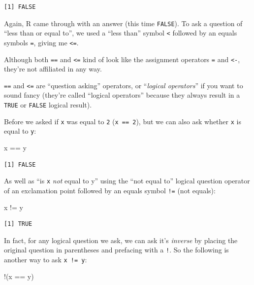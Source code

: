 \documentclass[
  letterpaper,
  DIV=11,
  numbers=noendperiod]{scrreprt}
\newenvironment{Shaded}{\begin{snugshade}}{\end{snugshade}}
\newcommand{\NormalTok}[1]{\textcolor[rgb]{0.00,0.23,0.31}{#1}}
\newcommand{\SpecialCharTok}[1]{\textcolor[rgb]{0.37,0.37,0.37}{#1}}
\begin{document}
\begin{verbatim}
[1] FALSE
\end{verbatim}

Again, R came through with an answer (this time \texttt{FALSE}). To ask
a question of ``less than or equal to'', we used a ``less than'' symbol
\texttt{\textless{}} followed by an equals symbols \texttt{=}, giving me
\texttt{\textless{}=}.

Although both \texttt{==} and \texttt{\textless{}=} kind of look like
the assignment operators \texttt{=} and \texttt{\textless{}-}, they're
not affiliated in any way.

\texttt{==} and \texttt{\textless{}=} are ``question asking'' operators,
or ``\emph{logical operators}'' if you want to sound fancy (they're
called ``logical operators'' because they always result in a
\texttt{TRUE} or \texttt{FALSE} logical result).

Before we asked if \texttt{x} was equal to \texttt{2}
(\texttt{x\ ==\ 2}), but we can also ask whether \texttt{x} is equal to
\texttt{y}:

\begin{Shaded}
\begin{Highlighting}[]
\NormalTok{x }\SpecialCharTok{==}\NormalTok{ y}
\end{Highlighting}
\end{Shaded}

\begin{verbatim}
[1] FALSE
\end{verbatim}

As well as ``is \texttt{x} \emph{not} equal to y'' using the ``not equal
to'' logical question operator of an exclamation point followed by an
equals symbol \texttt{!=} (not equals):

\begin{Shaded}
\begin{Highlighting}[]
\NormalTok{x }\SpecialCharTok{!=}\NormalTok{ y}
\end{Highlighting}
\end{Shaded}

\begin{verbatim}
[1] TRUE
\end{verbatim}

In fact, for any logical question we ask, we can ask it's \emph{inverse}
by placing the original question in parentheses and prefacing with a
\texttt{!}. So the following is another way to ask \texttt{x\ !=\ y}:

\begin{Shaded}
\begin{Highlighting}[]
\SpecialCharTok{!}\NormalTok{(x }\SpecialCharTok{==}\NormalTok{ y)}
\end{Highlighting}
\end{Shaded}
\end{document}
